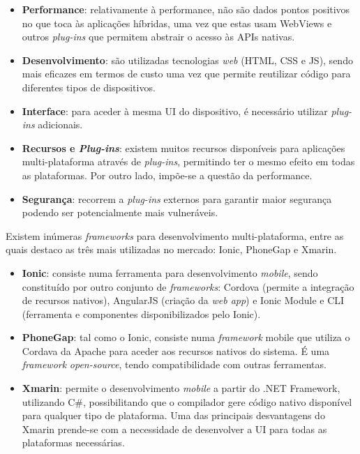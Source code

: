 \begin{itemize}
	\item \textbf{Performance}: relativamente à performance, não são dados pontos positivos no que toca às aplicações híbridas, uma vez que estas usam  WebViews e outros \textit{plug-ins} que permitem abstrair o acesso às APIs nativas. 

	
	\item \textbf{Desenvolvimento}: são utilizadas tecnologias \textit{web} (\ac{HTML}, \ac{CSS} e \ac{JS}), sendo mais eficazes em termos de custo uma vez que permite reutilizar código para diferentes tipos de dispositivos. 
	
	
	\item \textbf{Interface}: para aceder à mesma \ac{UI} do dispositivo, é necessário utilizar \textit{plug-ins} adicionais. 
	
	
	\item \textbf{Recursos e \textit{Plug-ins}}: existem muitos recursos disponíveis para aplicações \linebreak multi-plataforma através de \textit{plug-ins}, permitindo ter o mesmo efeito em todas as plataformas. Por outro lado, impõe-se a questão da performance. 

	
	\item \textbf{Segurança}: recorrem a \textit{plug-ins} externos para garantir maior segurança podendo ser potencialmente mais vulneráveis.
	
	
\end{itemize}

Existem inúmeras \textit{frameworks} para desenvolvimento multi-plataforma, entre as quais destaco as três mais utilizadas no mercado: Ionic, PhoneGap e Xmarin. 

\begin{itemize}
	\item \textbf{Ionic}: consiste numa ferramenta para desenvolvimento \textit{mobile}, sendo constituído por outro conjunto de \textit{frameworks}: Cordova (permite a integração de recursos nativos), AngularJS (criação da \textit{web app}) e Ionic Module e CLI (ferramenta e componentes disponibilizados pelo Ionic)\cite{Ionic2016}. 
	
	\item \textbf{PhoneGap}: tal como o Ionic, consiste numa \textit{framework} mobile que utiliza o Cordava da Apache para aceder aos recursos nativos do sistema. É uma \textit{framework} \textit{open-source}, tendo compatibilidade com outras ferramentas. 
	
	\item \textbf{Xmarin}: permite o desenvolvimento \textit{mobile} a partir do .NET Framework, utilizando C\#, possibilitando que o compilador gere código nativo disponível para qualquer tipo de plataforma. Uma das principais desvantagens do Xmarin prende-se com a necessidade de desenvolver a \ac{UI} para todas as plataformas necessárias. 
\end{itemize}
 


